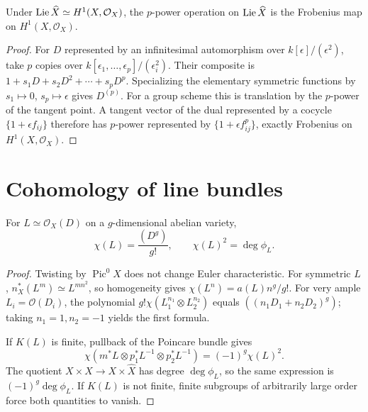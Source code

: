 \begin{theorem}
\label{mumford-thm-lie-dual-frobenius}
Under $\operatorname{Lie}\widehat X\simeq H^1(X,\mathcal O_X)$, the $p$-power operation
on $\operatorname{Lie}\widehat X$ is the Frobenius map on $H^1(X,\mathcal O_X)$.
\end{theorem}
\begin{proof}
For $D$ represented by an infinitesimal automorphism over
$k[\epsilon]/(\epsilon^2)$, take $p$ copies over
$k[\epsilon_1,\ldots,\epsilon_p]/(\epsilon_i^2)$. Their composite is
$1+s_1D+s_2D^2+\cdots+s_pD^p$. Specializing the elementary symmetric
functions by $s_1\mapsto0$, $s_p\mapsto\epsilon$ gives $D^{(p)}$.
For a group scheme this is translation by the $p$-power of the tangent
point. A tangent vector of the dual represented by a cocycle
$\{1+\epsilon f_{ij}\}$ therefore has $p$-power represented by
$\{1+\epsilon f_{ij}^p\}$, exactly Frobenius on $H^1(X,\mathcal O_X)$.
\end{proof}

\section{Cohomology of line bundles}
\label{mumford-III16-source}

\begin{theorem}
\label{mumford-thm-riemann-roch}
For $L\simeq\mathcal O_X(D)$ on a $g$-dimensional abelian variety,
\[
\chi(L)=\frac{(D^g)}{g!},\qquad \chi(L)^2=\deg\phi_L.
\]
\end{theorem}
\begin{proof}
Twisting by $\operatorname{Pic}^0X$ does not change Euler characteristic.
For symmetric $L$, $n_X^*(L^m)\simeq L^{mn^2}$, so homogeneity gives
$\chi(L^n)=a(L)n^g/g!$. For very ample $L_i=\mathcal O(D_i)$, the polynomial
$g!\chi(L_1^{n_1}\otimes L_2^{n_2})$ equals
$((n_1D_1+n_2D_2)^g)$; taking $n_1=1,n_2=-1$ yields the first formula.

If $K(L)$ is finite, pullback of the Poincare bundle gives
\[
\chi(m^*L\otimes p_1^*L^{-1}\otimes p_2^*L^{-1})=(-1)^g\chi(L)^2.
\]
The quotient $X\times X\to X\times\widehat X$ has degree $\deg\phi_L$,
so the same expression is $(-1)^g\deg\phi_L$. If $K(L)$ is not finite,
 finite subgroups of arbitrarily large order force both quantities to vanish.
\end{proof}

